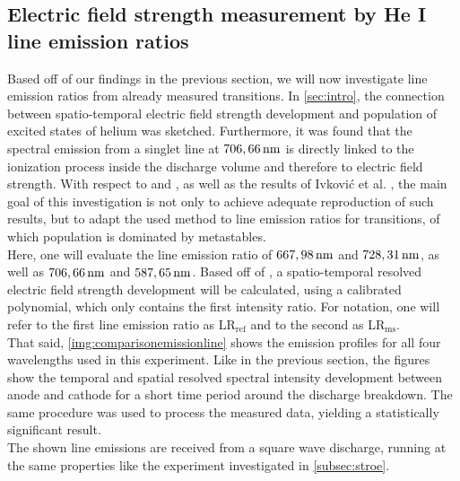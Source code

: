 \documentclass[a4paper,10pt,twoside]{article}
\newcommand{\ix}[1]{_\text{#1}}
\begin{document}
			\begin{multicols*}{2}
				
				\subsection{Electric field strength measurement by He I line emission ratios}
				
					Based off of our findings in the previous section, we will now investigate line emission ratios from already measured transitions. In \autoref{sec:intro}, the connection between spatio-temporal electric field strength development and population of excited states of helium was sketched. Furthermore, it was found that the spectral emission from a singlet line at $\unit[706,66]{nm}$ is directly linked to the ionization process inside the discharge volume and therefore to electric field strength. With respect to \cite{Massines} and \cite{0022-3727-36-1-306}, as well as the results of Ivkovi{\'c} et al. \cite{linratio1_14} \cite{lineratio2_14}, the main goal of this investigation is not only to achieve adequate reproduction of such results, but to adapt the used method to line emission ratios for transitions, of which population is dominated by metastables.\\
					Here, one will evaluate the line emission ratio of $\unit[667,98]{nm}$ and $\unit[728,31]{nm}$, as well as $\unit[706,66]{nm}$ and $\unit[587,65]{nm}$. Based off of \cite{linratio1_14}, a spatio-temporal resolved electric field strength development will be calculated, using a calibrated polynomial, which only contains the first intensity ratio. For notation, one will refer to the first line emission ratio as LR$\ix{ref}$ and to the second as LR$\ix{ms}$.\\
					That said, \autoref{img:comparisonemissionline} shows the emission profiles for all four wavelengths used in this experiment. Like in the previous section, the figures show the temporal and spatial resolved spectral intensity development between anode and cathode for a short time period around the discharge breakdown. The same procedure was used to process the measured data, yielding a statistically significant result.\\
					The shown line emissions are received from a square wave discharge, running at the same properties like the experiment investigated in \autoref{subsec:stroe}.
				
			\end{multicols*}
			
			\twocolumn
		
\end{document}

